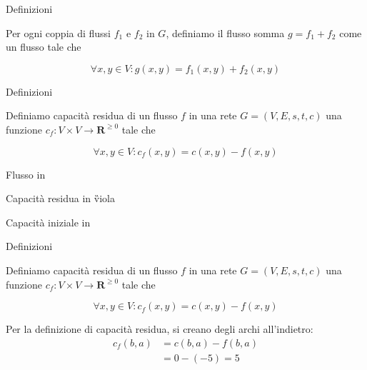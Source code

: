 \begin{frame}{Definizioni}

\vspace{-9pt}
\begin{myboxtitle}
Per ogni coppia di flussi $f_1$ e $f_2$ in $G$, definiamo il \alert{flusso somma} $g = f_1+f_2$ come un flusso tale che 

\[
  \forall x,y \in V: g(x,y) = f_1(x,y) + f_2(x,y)
\]
\end{myboxtitle}


\end{frame}

\begin{frame}{Definizioni}

\vspace{-9pt}
\begin{myboxtitle}
Definiamo \alert{capacità residua} di un flusso $f$ in una rete $G=(V,E,s,t,c)$ 
una funzione $c_f: V \times V \rightarrow \mathbf{R}^{\geq 0}$
tale che 

\[
  \forall x,y \in V: c_f(x,y) = c(x,y) - f(x,y)
\]
\end{myboxtitle}

\smallskip
\begin{center}
\end{center}

\BI
\item Flusso in 
\item Capacità residua in \G{viola}
\item Capacità iniziale in 
\EI
\end{frame}

\begin{frame}{Definizioni}

\vspace{-9pt}
\begin{myboxtitle}
Definiamo \alert{capacità residua} di un flusso $f$ in una rete $G=(V,E,s,t,c)$ 
una funzione $c_f: V \times V \rightarrow \mathbf{R}^{\geq 0}$
tale che 

\[
  \forall x,y \in V: c_f(x,y) = c(x,y) - f(x,y)
\]
\end{myboxtitle}

\smallskip
\begin{center}
\end{center}

Per la definizione di capacità residua, si creano degli archi all'indietro:
\begin{align*}
  c_f(b,a) &= c(b,a) - f(b,a) \\
           &= 0 - (-5)  = 5 \\
\end{align*}

\end{frame}

